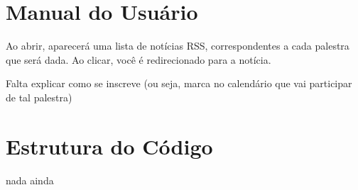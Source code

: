 




\cabecalho

\section{Manual do Usuário}
Ao abrir, aparecerá uma lista de notícias RSS, correspondentes a cada
palestra que será dada. Ao clicar, você é redirecionado para a notícia.

Falta explicar como se inscreve (ou seja, marca no calendário que vai
participar de tal palestra)

\section{Estrutura do Código}
nada ainda


